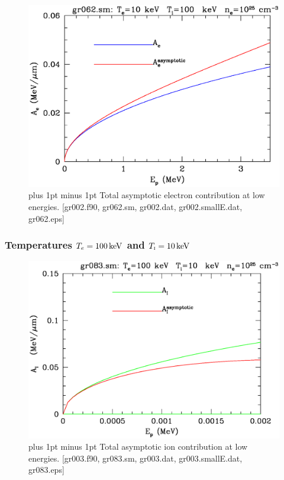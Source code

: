 \documentclass[preprint,12pt,eqsecnum,nofootinbib,amsmath,amssymb]{revtex4}
\newcommand{\smI}{{\rm\scriptscriptstyle I}}
\newcommand{\footnoteskip}{\baselineskip 12pt plus 1pt minus 1pt}
\begin{document}
\vskip-2cm 
\begin{figure}[h!]
\includegraphics[scale=0.45]{gr062.eps} 
\vskip-0.8cm 
\caption{\footnoteskip  
  Total asymptotic electron contribution at low energies. 
 [gr002.f90, gr062.sm, gr002.dat, gr002.smallE.dat, gr062.eps] 
}
\label{fig:gr062}
\end{figure}


\pagebreak
\subsubsection{Temperatures $T_e=100\,{\rm keV}$ and $T_\smI=10\,{\rm
    keV}$}

\vskip-2cm 
\begin{figure}[h!]
\includegraphics[scale=0.45]{gr083.eps} 
\vskip-0.8cm 
\caption{\footnoteskip  
  Total asymptotic ion contribution at low energies. 
 [gr003.f90, gr083.sm, gr003.dat, gr003.smallE.dat, gr083.eps] 
}
\label{fig:gr083}
\end{figure}
\end{document}
